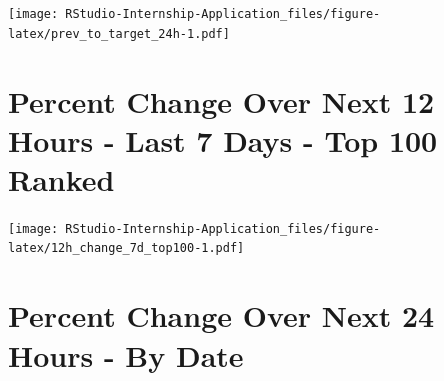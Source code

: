 \documentclass[
]{book}
\newenvironment{Shaded}{\begin{snugshade}}{\end{snugshade}}
\newcommand{\CommentTok}[1]{\textcolor[rgb]{0.56,0.35,0.01}{\textit{#1}}}
\newcommand{\DataTypeTok}[1]{\textcolor[rgb]{0.13,0.29,0.53}{#1}}
\newcommand{\FloatTok}[1]{\textcolor[rgb]{0.00,0.00,0.81}{#1}}
\newcommand{\KeywordTok}[1]{\textcolor[rgb]{0.13,0.29,0.53}{\textbf{#1}}}
\newcommand{\NormalTok}[1]{#1}
\newcommand{\OperatorTok}[1]{\textcolor[rgb]{0.81,0.36,0.00}{\textbf{#1}}}
\newcommand{\StringTok}[1]{\textcolor[rgb]{0.31,0.60,0.02}{#1}}
\begin{document}
\begin{Shaded}
\end{Shaded}

\texttt{[image: RStudio-Internship-Application\_files/figure-latex/prev\_to\_target\_24h-1.pdf]}

\begin{Shaded}
\end{Shaded}

\hypertarget{percent-change-over-next-12-hours---last-7-days---top-100-ranked}{%
\section{Percent Change Over Next 12 Hours - Last 7 Days - Top 100 Ranked}\label{percent-change-over-next-12-hours---last-7-days---top-100-ranked}}

\texttt{[image: RStudio-Internship-Application\_files/figure-latex/12h\_change\_7d\_top100-1.pdf]}

\hypertarget{percent-change-over-next-24-hours---by-date}{%
\section{Percent Change Over Next 24 Hours - By Date}\label{percent-change-over-next-24-hours---by-date}}
\end{document}
